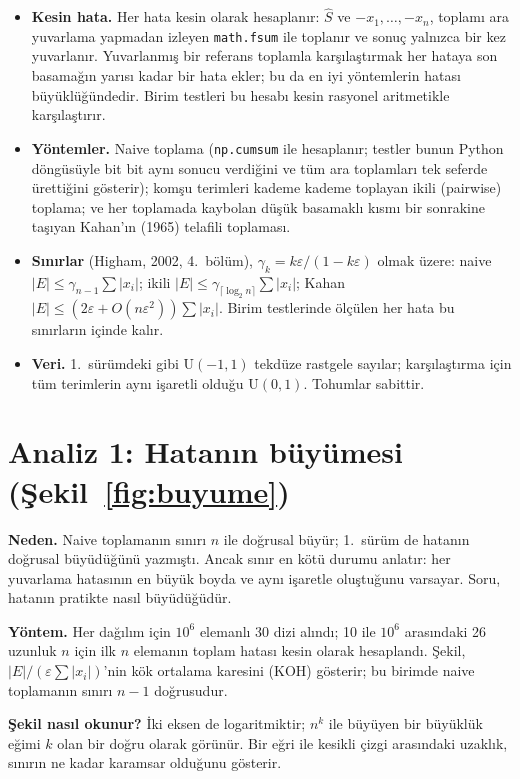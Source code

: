 \documentclass[11pt,a4paper]{article}
\begin{document}
\begin{itemize}
  \item \textbf{Kesin hata.} Her hata kesin olarak hesaplanır: $\hat S$ ve $-x_1, \dots, -x_n$, toplamı ara yuvarlama yapmadan
  izleyen \texttt{math.fsum} ile toplanır ve sonuç yalnızca bir kez yuvarlanır. Yuvarlanmış bir referans toplamla
  karşılaştırmak her hataya son basamağın yarısı kadar bir hata ekler; bu da en iyi yöntemlerin hatası büyüklüğündedir. Birim
  testleri bu hesabı kesin rasyonel aritmetikle karşılaştırır.
  \item \textbf{Yöntemler.} Naive toplama (\texttt{np.cumsum} ile hesaplanır; testler bunun Python döngüsüyle bit bit aynı
  sonucu verdiğini ve tüm ara toplamları tek seferde ürettiğini gösterir); komşu terimleri kademe kademe toplayan ikili
  (pairwise) toplama; ve her toplamada kaybolan düşük basamaklı kısmı bir sonrakine taşıyan Kahan'ın (1965) telafili toplaması.
  \item \textbf{Sınırlar} (Higham, 2002, 4.\ bölüm), $\gamma_k = k\varepsilon/(1-k\varepsilon)$ olmak üzere:
  naive $|E| \le \gamma_{n-1}\sum|x_i|$; ikili $|E| \le \gamma_{\lceil \log_2 n\rceil}\sum|x_i|$; Kahan
  $|E| \le (2\varepsilon + O(n\varepsilon^2))\sum|x_i|$. Birim testlerinde ölçülen her hata bu sınırların içinde kalır.
  \item \textbf{Veri.} 1.\ sürümdeki gibi $\mathrm{U}(-1,1)$ tekdüze rastgele sayılar; karşılaştırma için tüm terimlerin aynı
  işaretli olduğu $\mathrm{U}(0,1)$. Tohumlar sabittir.
\end{itemize}

\section{Analiz 1: Hatanın büyümesi (Şekil~\ref{fig:buyume})}

\textbf{Neden.} Naive toplamanın sınırı $n$ ile doğrusal büyür; 1.\ sürüm de hatanın doğrusal büyüdüğünü yazmıştı. Ancak sınır
en kötü durumu anlatır: her yuvarlama hatasının en büyük boyda ve aynı işaretle oluştuğunu varsayar. Soru, hatanın pratikte
nasıl büyüdüğüdür.

\textbf{Yöntem.} Her dağılım için $10^6$ elemanlı 30 dizi alındı; 10 ile $10^6$ arasındaki 26 uzunluk $n$ için ilk $n$
elemanın toplam hatası kesin olarak hesaplandı. Şekil, $|E|/(\varepsilon\sum|x_i|)$'nin kök ortalama karesini (KOH)
gösterir; bu birimde naive toplamanın sınırı $n-1$ doğrusudur.

\textbf{Şekil nasıl okunur?} İki eksen de logaritmiktir; $n^k$ ile büyüyen bir büyüklük eğimi $k$ olan bir doğru olarak
görünür. Bir eğri ile kesikli çizgi arasındaki uzaklık, sınırın ne kadar karamsar olduğunu gösterir.
\end{document}
